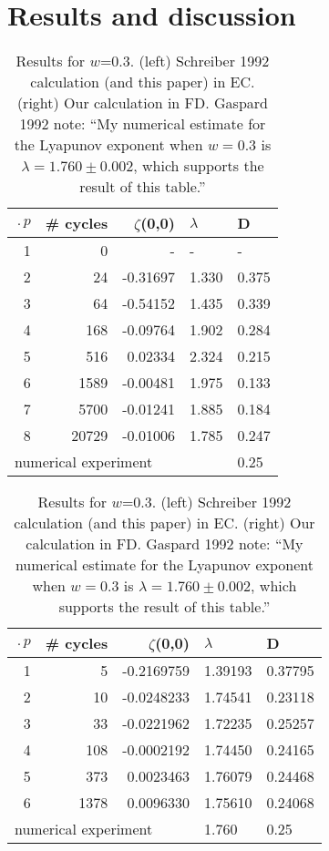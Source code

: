 \documentclass[aps,pre,
                showpacs,
                twocolumn,
                groupedaddress,
                floatfix]{revtex4-1}
\begin{document}
\section{Results and discussion}


\begin{table}[htbp]
{\small
\begin{tabular}{|r|r|r|l|l|}
\hline
$\period{p}$ & \# cycles & $\zeta$(0,0) & $\lambda$ & D \\ \hline\hline
1      & 0      &   -    &   -  &   - \\
2      & 24     & -0.31697 & 1.330 & 0.375\\
3      & 64     & -0.54152 & 1.435 & 0.339\\
4      & 168    & -0.09764 & 1.902 & 0.284\\
5      & 516    &  0.02334 & 2.324 & 0.215\\
6      & 1589   & -0.00481 & 1.975 & 0.133\\
7      & 5700   & -0.01241 & 1.885 & 0.184\\
8      & 20729  & -0.01006 & 1.785 & 0.247\\ \hline\hline
\multicolumn{4}{|l|}{numerical experiment} 1.760 & 0.25 \\ \hline
\end{tabular}
\hfill
\begin{tabular}{|r|r|r|l|l|}
\hline
$\period{p}$ & \# cycles & $\zeta$(0,0) & $\lambda$ & D \\ \hline\hline
1      & 5      &   -0.2169759    &   1.39193  &   0.37795 \\
2      & 10     & -0.0248233 & 1.74541 & 0.23118\\
3      & 33     & -0.0221962 & 1.72235 & 0.25257\\
4      & 108    & -0.0002192 & 1.74450 & 0.24165\\
5      & 373    &  0.0023463 & 1.76079 & 0.24468\\
6      & 1378   &  0.0096330 & 1.75610 & 0.24068\\ \hline\hline
\multicolumn{3}{|l|}{numerical experiment}
                           & 1.760 & 0.25
\\ \hline
\end{tabular}
}

\caption{\label{TCELL2}
  Results for $w$=0.3. (left) Schreiber 1992 calculation (and
  this paper) in EC. (right) Our calculation in FD. Gaspard 1992
  note: ``My numerical estimate for the Lyapunov exponent when $w=0.3$ is
  $\lambda = 1.760 \pm 0.002$, which supports the result of this table.''
}
\end{table}
\end{document}
